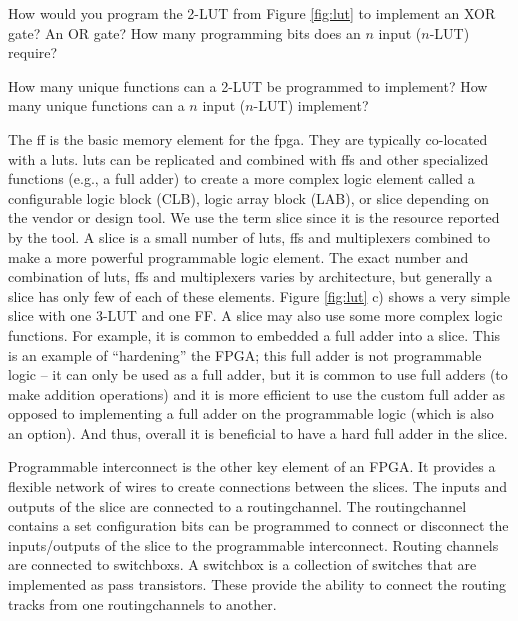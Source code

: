 \begin{exercise}
How would you program the 2-LUT from Figure \ref{fig:lut} to implement an XOR gate? An OR gate? How many programming bits does an $n$ input ($n$-LUT) require?
\end{exercise}

\begin{exercise}
How many unique functions can a 2-LUT be programmed to implement? How many unique functions can a $n$ input ($n$-LUT) implement? 
\end{exercise}

The \gls{ff} is the basic memory element for the \gls{fpga}. They are typically co-located with a \glspl{lut}. \gls{lut}s can be replicated and combined with \glspl{ff} and other specialized functions (e.g., a full adder) to create a more complex logic element called a configurable logic block (CLB), logic array block (LAB), or \gls{slice} depending on the vendor or design tool. We use the term \gls{slice} since it is the resource reported by the \VHLS tool.  A \gls{slice} is a small number of \glspl{lut}, \glspl{ff} and multiplexers combined to make a more powerful programmable logic element. The exact number and combination of  \glspl{lut}, \glspl{ff} and multiplexers varies by architecture, but generally a slice has only few of each of these elements. Figure \ref{fig:lut} c) shows a very simple slice with one 3-LUT and one FF. A \gls{slice} may also use some more complex logic functions. For example, it is common to embedded a full adder into a slice. This is an example of ``hardening'' the FPGA; this full adder is not programmable logic -- it can only be used as a full adder, but it is common to use full adders (to make addition operations) and it is more efficient to use the custom full adder as opposed to implementing a full adder on the programmable logic (which is also an option). And thus, overall it is beneficial to have a hard full adder in the slice.

Programmable interconnect is the other key element of an FPGA. It provides a flexible network of wires to create connections between the slices. The inputs and outputs of the \gls{slice} are connected to a \gls{routingchannel}. The \gls{routingchannel} contains a set configuration bits can be programmed to connect or disconnect the inputs/outputs of the \gls{slice} to the programmable interconnect. Routing channels are connected to \glspl{switchbox}. A \gls{switchbox} is a collection of switches that are implemented as pass transistors. These provide the ability to connect the routing tracks from one \glspl{routingchannel} to another. 

